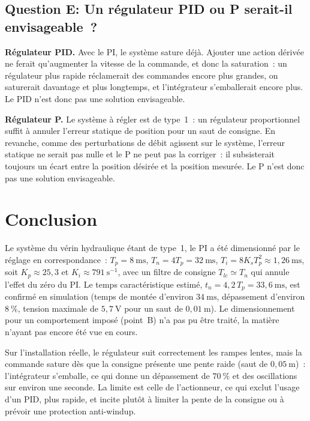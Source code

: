 ﻿\documentclass[a4paper,5pt]{article}
\begin{document}
\subsection{Question E: Un régulateur PID ou P serait-il envisageable~?}

\textbf{Régulateur PID.} Avec le PI, le système sature déjà. Ajouter une action
dérivée ne ferait qu'augmenter la vitesse de la commande, et donc la
saturation~: un régulateur plus rapide réclamerait des commandes encore plus
grandes, on saturerait davantage et plus longtemps, et l'intégrateur
s'emballerait encore plus. Le PID n'est donc pas une solution envisageable.

\textbf{Régulateur P.} Le système à régler est de type~1~: un régulateur
proportionnel suffit à annuler l'erreur statique de position pour un saut de
consigne. En revanche, comme des perturbations
de débit agissent sur le système, l'erreur statique ne serait pas nulle et le P
ne peut pas la corriger~: il subsisterait toujours un écart entre la position
désirée et la position mesurée. Le P n'est donc pas une solution envisageable.

\section{Conclusion}

Le système du vérin hydraulique étant de type~1, le PI a été dimensionné par le
réglage en correspondance~: $T_p = 8~\mathrm{ms}$,
$T_n = 4T_p = 32~\mathrm{ms}$, $T_i = 8K_sT_p^2 \approx 1{,}26~\mathrm{ms}$, soit
$K_p \approx 25{,}3$ et $K_i \approx 791~\mathrm{s^{-1}}$, avec un filtre de
consigne $T_{lc} \simeq T_n$ qui annule l'effet du zéro du PI. Le temps
caractéristique estimé, $t_n = 4{,}2\,T_p = 33{,}6~\mathrm{ms}$, est confirmé en
simulation (temps de montée d'environ $34~\mathrm{ms}$, dépassement d'environ
$8~\%$, tension maximale de $5{,}7~\mathrm{V}$ pour un saut de
$0{,}01~\mathrm{m}$). Le dimensionnement pour un comportement imposé (point~B)
n'a pas pu être traité, la matière n'ayant pas encore été vue en cours.

Sur l'installation réelle, le régulateur suit correctement les rampes lentes,
mais la commande sature dès que la consigne présente une pente raide (saut de
$0{,}05~\mathrm{m}$)~: l'intégrateur s'emballe, ce qui donne un dépassement de
$70~\%$ et des oscillations sur environ une seconde. La limite est celle de
l'actionneur, ce qui exclut l'usage d'un PID, plus rapide, et incite plutôt à
limiter la pente de la consigne ou à prévoir une protection anti-windup.
\end{document}
